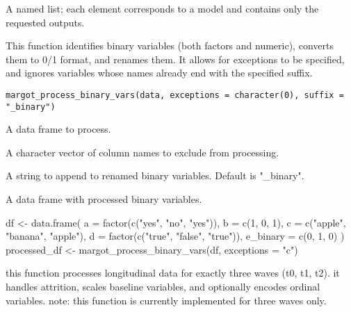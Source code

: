 \documentclass[a4paper]{book}
\begin{document}
%
\begin{Value}
A named list; each element corresponds to a model and contains only
the requested outputs.
\end{Value}
%
\begin{Description}
This function identifies binary variables (both factors and numeric),
converts them to 0/1 format, and renames them. It allows for exceptions
to be specified, and ignores variables whose names already end with the
specified suffix.
\end{Description}
%
\begin{Usage}
\begin{verbatim}
margot_process_binary_vars(data, exceptions = character(0), suffix = "_binary")
\end{verbatim}
\end{Usage}
%
\begin{Arguments}
\begin{ldescription}
\item[\code{data}] A data frame to process.

\item[\code{exceptions}] A character vector of column names to exclude from processing.

\item[\code{suffix}] A string to append to renamed binary variables. Default is "\_binary".
\end{ldescription}
\end{Arguments}
%
\begin{Value}
A data frame with processed binary variables.
\end{Value}
%
\begin{Examples}
\begin{ExampleCode}
df <- data.frame(
  a = factor(c("yes", "no", "yes")),
  b = c(1, 0, 1),
  c = c("apple", "banana", "apple"),
  d = factor(c("true", "false", "true")),
  e_binary = c(0, 1, 0)
)
processed_df <- margot_process_binary_vars(df, exceptions = "c")

\end{ExampleCode}
\end{Examples}
%
\begin{Description}
this function processes longitudinal data for exactly three waves (t0, t1, t2).
it handles attrition, scales baseline variables, and optionally encodes ordinal variables.
note: this function is currently implemented for three waves only.
\end{Description}
\end{document}
